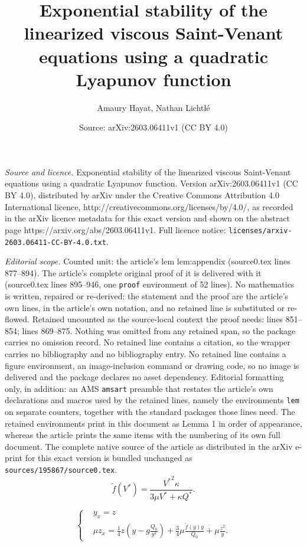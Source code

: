 \documentclass[10pt,a4paper]{amsart}
\title{Exponential stability of the {linearized} viscous Saint-Venant equations using a quadratic Lyapunov function}
\author{Amaury Hayat, Nathan Lichtl\'e}
\date{Source: arXiv:2603.06411v1 (CC BY 4.0)}
\begin{document}
\maketitle

\noindent\emph{Source and licence.} Exponential stability of the {linearized} viscous Saint-Venant equations using a quadratic Lyapunov function. Version arXiv:2603.06411v1 (CC BY 4.0), distributed by arXiv under the Creative Commons Attribution 4.0 International licence, http://creativecommons.org/licenses/by/4.0/, as recorded in the arXiv licence metadata for this exact version and shown on the abstract page https://arxiv.org/abs/2603.06411v1. Full licence notice: \texttt{licenses/arxiv-2603.06411-CC-BY-4.0.txt}.\par\smallskip

\noindent\textit{Editorial scope.} Counted unit: the article's lem lem:appendix (source0.tex lines 877--894). The article's complete original proof of it is delivered with it (source0.tex lines 895--946, one \texttt{proof} environment of 52 lines). No mathematics is written, repaired or re-derived: the statement and the proof are the article's own lines, in the article's own notation, and no retained line is substituted or re-flowed.  Retained uncounted as the source-local context the proof needs: lines 851--854; lines 869--875.  Nothing was omitted from any retained span, so the package carries no omission record.  No retained line contains a citation, so the wrapper carries no bibliography and no bibliography entry.  No retained line contains a figure environment, an image-inclusion command or drawing code, so no image is delivered and the package declares no asset dependency.  Editorial formatting only, in addition: an AMS \texttt{amsart} preamble that restates the article's own declarations and macros used by the retained lines, namely the environments \texttt{lem} on separate counters, together with the standard packages those lines need.  The retained environments print in this document as Lemma 1 in order of appearance, whereas the article prints the same items with the numbering of its own full document.  The complete native source of the article as distributed in the arXiv e-print for this exact version is bundled unchanged as \texttt{sources/195867/source0.tex}.
\begin{equation}
\label{eq:deftildef}
\tilde{f}(V^{*}) = \frac{{V^{*}}^{2}\kappa}{3\mu V^{*}+\kappa Q^{*}}.
\end{equation}

\begin{equation}
\label{eq:sys4}
    \begin{cases}
        &y_{x} = z\\
        & \mu z_{x} = \frac{1}{4}z\left(y-g \frac{Q_{0}}{y^{2}}\right)+\frac{3}{4}\mu \frac{\tilde{f}(y)y}{Q_{0}}+\mu \frac{z^{2}}{y}.
    \end{cases}
\end{equation}
\end{document}
